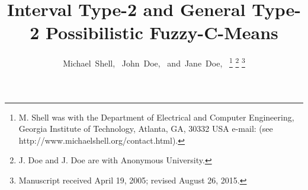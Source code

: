 \documentclass[journal, onecolumn]{IEEEtran}
\begin{document}
%
\title{Interval Type-2 and General Type-2 Possibilistic Fuzzy-C-Means}
%
%
%

\author{Michael~Shell,~
        John~Doe,~
        and~Jane~Doe,~%
\thanks{M. Shell was with the Department
of Electrical and Computer Engineering, Georgia Institute of Technology, Atlanta,
GA, 30332 USA e-mail: (see http://www.michaelshell.org/contact.html).}%
\thanks{J. Doe and J. Doe are with Anonymous University.}%
\thanks{Manuscript received April 19, 2005; revised August 26, 2015.}}

% 
%
\end{document}
